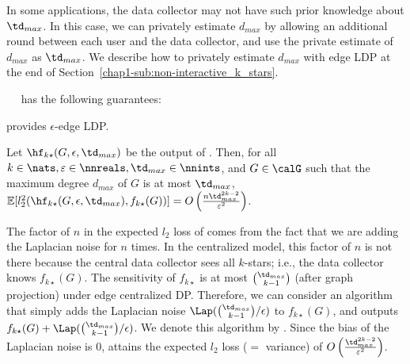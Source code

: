 In some applications, the data collector may not have such prior knowledge about $\td_{max}$. 
In this case, we can 
privately estimate $d_{max}$ by allowing an additional round between each user and the data collector, and use the private estimate of $d_{max}$ as $\td_{max}$. 
We describe how to privately estimate $d_{max}$ with edge LDP at the end of Section~\ref{chap1-sub:non-interactive_k_stars}. 



\smallskip
{}~~ 
has the following guarantees:

\begin{theorem}\label{chap1-thm:k-stars_LDP}
  provides $\epsilon$-edge LDP.
\end{theorem}

\begin{theorem}\label{chap1-thm:k-stars}
  Let
  $\hf_{k\star}(G, \epsilon, \td_{max})$ 
  be the output of 
  . 
  Then, for all 
  $k \in \nats,\varepsilon \in \nnreals,\td_{max} \in \nnints$, 
  and $G \in \calG$
  such that the maximum degree $d_{max}$ of $G$ 
  is at most 
  $\td_{max}$, 
  $\mathbb{E}[l_2^2(\hf_{k\star}(G, \epsilon, \td_{max}), f_{k\star}(G))] = 
  O\left( \frac{n \td_{max}^{2k-2}}{\varepsilon^2} \right)$. 
\end{theorem}

The factor of $n$ in the 
expected $l_2$ loss 
of 
comes from the fact that we are adding 
the Laplacian noise for $n$ times. 
In the centralized model, this factor of $n$ is not there
because the central data collector sees all $k$-stars; i.e., the data collector knows $f_{k\star}(G)$. 
The 
sensitivity of $f_{k\star}$ is 
at most $\binom{\td_{max}}{k-1}$ (after graph projection) under edge centralized DP. 
Therefore, we can consider an algorithm that simply adds the Laplacian noise $\Lap(\binom{\td_{max}}{k-1}/\epsilon)$ to $f_{k\star}(G)$, and outputs $f_{k\star}(G) + \Lap(\binom{\td_{max}}{k-1}/\epsilon)$. 
We denote this algorithm by . 
Since the bias of the Laplacian noise is $0$, 
 attains the expected $l_2$ loss ($=$ variance) of $O\left(\frac{\td_{max}^{2k-2}}{\varepsilon^2}\right)$. 

